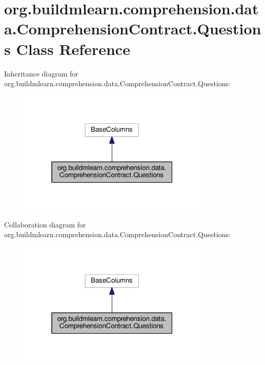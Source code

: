 \hypertarget{classorg_1_1buildmlearn_1_1comprehension_1_1data_1_1ComprehensionContract_1_1Questions}{}\section{org.\+buildmlearn.\+comprehension.\+data.\+Comprehension\+Contract.\+Questions Class Reference}
\label{classorg_1_1buildmlearn_1_1comprehension_1_1data_1_1ComprehensionContract_1_1Questions}


Inheritance diagram for org.\+buildmlearn.\+comprehension.\+data.\+Comprehension\+Contract.\+Questions\+:
\nopagebreak
\begin{figure}[H]
\begin{center}
\leavevmode
\includegraphics[width=256pt]{classorg_1_1buildmlearn_1_1comprehension_1_1data_1_1ComprehensionContract_1_1Questions__inherit__graph}
\end{center}
\end{figure}


Collaboration diagram for org.\+buildmlearn.\+comprehension.\+data.\+Comprehension\+Contract.\+Questions\+:
\nopagebreak
\begin{figure}[H]
\begin{center}
\leavevmode
\includegraphics[width=256pt]{classorg_1_1buildmlearn_1_1comprehension_1_1data_1_1ComprehensionContract_1_1Questions__coll__graph}
\end{center}
\end{figure}
